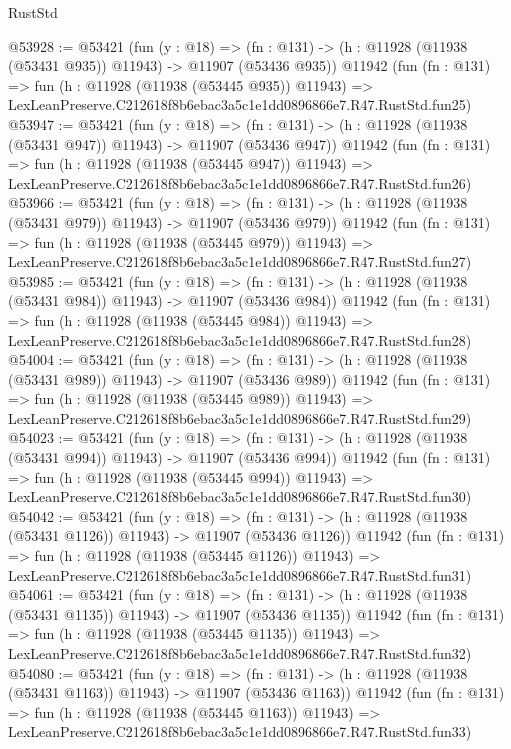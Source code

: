 \begin{lexlean}{RustStd}
\begin{coremodule}
@53928 := @53421
    (fun (y : @18) =>
    (fn : @131) -> (h : @11928 (@11938 (@53431 @935)) @11943) -> @11907 (@53436 @935))
    @11942
    (fun (fn : @131) =>
    fun (h : @11928 (@11938 (@53445 @935)) @11943) =>
    LexLeanPreserve.C212618f8b6ebac3a5c1e1dd0896866e7.R47.RustStd.fun25)
@53947 := @53421
    (fun (y : @18) =>
    (fn : @131) -> (h : @11928 (@11938 (@53431 @947)) @11943) -> @11907 (@53436 @947))
    @11942
    (fun (fn : @131) =>
    fun (h : @11928 (@11938 (@53445 @947)) @11943) =>
    LexLeanPreserve.C212618f8b6ebac3a5c1e1dd0896866e7.R47.RustStd.fun26)
@53966 := @53421
    (fun (y : @18) =>
    (fn : @131) -> (h : @11928 (@11938 (@53431 @979)) @11943) -> @11907 (@53436 @979))
    @11942
    (fun (fn : @131) =>
    fun (h : @11928 (@11938 (@53445 @979)) @11943) =>
    LexLeanPreserve.C212618f8b6ebac3a5c1e1dd0896866e7.R47.RustStd.fun27)
@53985 := @53421
    (fun (y : @18) =>
    (fn : @131) -> (h : @11928 (@11938 (@53431 @984)) @11943) -> @11907 (@53436 @984))
    @11942
    (fun (fn : @131) =>
    fun (h : @11928 (@11938 (@53445 @984)) @11943) =>
    LexLeanPreserve.C212618f8b6ebac3a5c1e1dd0896866e7.R47.RustStd.fun28)
@54004 := @53421
    (fun (y : @18) =>
    (fn : @131) -> (h : @11928 (@11938 (@53431 @989)) @11943) -> @11907 (@53436 @989))
    @11942
    (fun (fn : @131) =>
    fun (h : @11928 (@11938 (@53445 @989)) @11943) =>
    LexLeanPreserve.C212618f8b6ebac3a5c1e1dd0896866e7.R47.RustStd.fun29)
@54023 := @53421
    (fun (y : @18) =>
    (fn : @131) -> (h : @11928 (@11938 (@53431 @994)) @11943) -> @11907 (@53436 @994))
    @11942
    (fun (fn : @131) =>
    fun (h : @11928 (@11938 (@53445 @994)) @11943) =>
    LexLeanPreserve.C212618f8b6ebac3a5c1e1dd0896866e7.R47.RustStd.fun30)
@54042 := @53421
    (fun (y : @18) =>
    (fn : @131) -> (h : @11928 (@11938 (@53431 @1126)) @11943) -> @11907 (@53436 @1126))
    @11942
    (fun (fn : @131) =>
    fun (h : @11928 (@11938 (@53445 @1126)) @11943) =>
    LexLeanPreserve.C212618f8b6ebac3a5c1e1dd0896866e7.R47.RustStd.fun31)
@54061 := @53421
    (fun (y : @18) =>
    (fn : @131) -> (h : @11928 (@11938 (@53431 @1135)) @11943) -> @11907 (@53436 @1135))
    @11942
    (fun (fn : @131) =>
    fun (h : @11928 (@11938 (@53445 @1135)) @11943) =>
    LexLeanPreserve.C212618f8b6ebac3a5c1e1dd0896866e7.R47.RustStd.fun32)
@54080 := @53421
    (fun (y : @18) =>
    (fn : @131) -> (h : @11928 (@11938 (@53431 @1163)) @11943) -> @11907 (@53436 @1163))
    @11942
    (fun (fn : @131) =>
    fun (h : @11928 (@11938 (@53445 @1163)) @11943) =>
    LexLeanPreserve.C212618f8b6ebac3a5c1e1dd0896866e7.R47.RustStd.fun33)

\end{coremodule}
\end{lexlean}
